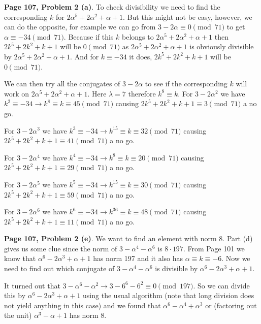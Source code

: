 \documentclass[aps,preprint,preprintnumbers,nofootinbib,showpacs,prd]{revtex4-1}
\begin{document}
{\bf Page 107, Problem 2 (a)}. To check divisibility we need to find the corresponding $k$ for $2\alpha^5 + 2\alpha^2 + \alpha + 1$. But this might not be easy, however, we can do the opposite, for example we can go from $3 - 2\alpha \equiv 0 \pmod{71}$ to get $\alpha \equiv -34 \pmod{71}$. Because if this $k$ belongs to $2\alpha^5 + 2\alpha^2 + \alpha + 1$ then $2k^5 + 2k^2 + k + 1$ will be $0 \pmod{71}$ as $2\alpha^5 + 2\alpha^2 + \alpha + 1$ is obviously divisible by $2\alpha^5 + 2\alpha^2 + \alpha + 1$. And for $k \equiv -34$ it does, $2k^5 + 2k^2 + k + 1$ will be $0 \pmod{71}$.

We can then try all the conjugates of $3 - 2\alpha$ to see if the corresponding $k$ will work on $2\alpha^5 + 2\alpha^2 + \alpha + 1$. Here $\lambda = 7$ therefore $k^8 \equiv k$. For $3 - 2\alpha^2$ we have $k^2 \equiv -34 \to k^8 \equiv k \equiv 45 \pmod{71}$ causing $2k^5 + 2k^2 + k + 1 \equiv 3 \pmod{71}$ a no go.

For $3 - 2\alpha^3$ we have $k^3 \equiv -34 \to k^{15} \equiv k \equiv 32 \pmod{71}$ causing $2k^5 + 2k^2 + k + 1 \equiv 41 \pmod{71}$ a no go.

For $3 - 2\alpha^4$ we have $k^4 \equiv -34 \to k^{8} \equiv k \equiv 20 \pmod{71}$ causing $2k^5 + 2k^2 + k + 1 \equiv 29 \pmod{71}$ a no go.

For $3 - 2\alpha^5$ we have $k^5 \equiv -34 \to k^{15} \equiv k \equiv 30 \pmod{71}$ causing $2k^5 + 2k^2 + k + 1 \equiv 59 \pmod{71}$ a no go.

For $3 - 2\alpha^6$ we have $k^6 \equiv -34 \to k^{36} \equiv k \equiv 48 \pmod{71}$ causing $2k^5 + 2k^2 + k + 1 \equiv 11 \pmod{71}$ a no go.







{\bf Page 107, Problem 2 (e)}. We want to find an element with norm 8. Part (d) gives us some clue since the norm of $3 - \alpha^4 - \alpha^6$ is $8\cdot 197$. From Page 101 we know that $\alpha^6 - 2\alpha^3 + \alpha + 1$ has norm 197 and it also has $\alpha \equiv k \equiv -6$. Now we need to find out which conjugate of $3 - \alpha^4 - \alpha^6$ is divisible by $\alpha^6 - 2\alpha^3 + \alpha + 1$.

It turned out that $3 - \alpha^6 - \alpha^2 \to 3 - 6^6 - 6^2 \equiv 0 \pmod{197}$. So we can divide this by $\alpha^6 - 2\alpha^3 + \alpha + 1$ using the usual algorithm (note that long division does not yield anything in this case) and we found that $\alpha^6 - \alpha^4 + \alpha^3$ or (factoring out the unit) $\alpha^3 - \alpha + 1$ has norm 8.
\end{document}
